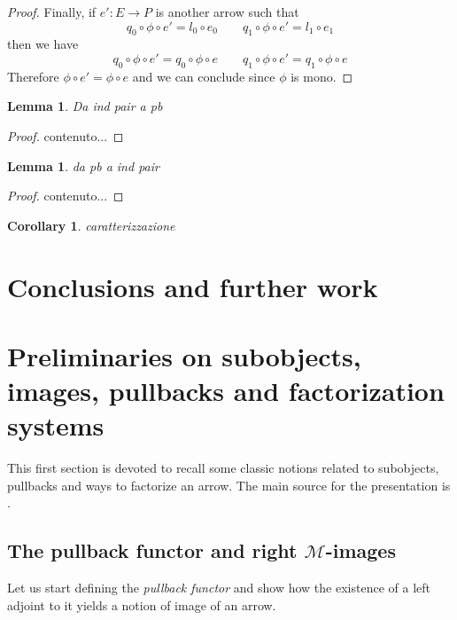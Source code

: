 \documentclass[a4paper]{article}
\newtheorem{lemma}[theorem]{Lemma}
\newtheorem{corollary}[theorem]{Corollary}
\theoremstyle{definition}
\begin{document}
\begin{proof}
Finally, if $e'\colon E \to P$ is another arrow such that 		
\[q_0\circ \phi\circ e'=l_0\circ e_0 \qquad q_1\circ \phi\circ e'=l_1\circ e_1\]
then we have 
\[q_0\circ \phi\circ e'=q_0\circ \phi\circ e \qquad q_1\circ \phi\circ e'=q_1\circ \phi\circ e\]
Therefore $\phi\circ e'=\phi \circ e$ and we can conclude since $\phi$ is mono.
	\end{proof}


\begin{lemma}
	Da ind pair a pb
\end{lemma}

\begin{proof}
	contenuto...
\end{proof}

\begin{lemma}
	da pb a ind pair
\end{lemma}
\begin{proof}
	contenuto...
\end{proof}

\begin{corollary}
	caratterizzazione
\end{corollary}




\section{Conclusions and further work}








\appendix

\section{Preliminaries on subobjects, images, pullbacks and factorization systems}\label{app:fact}
This first section is devoted to recall some classic notions related to subobjects, pullbacks and ways to factorize an arrow. The main source for the presentation is \cite[Ch.~1]{dikranjan2013categorical}.

\subsection{The pullback functor and right $\mathcal{M}$-images}
Let us start defining the \emph{pullback functor} and show how the existence of a left adjoint to it yields a notion of image of an arrow.
\end{document}
